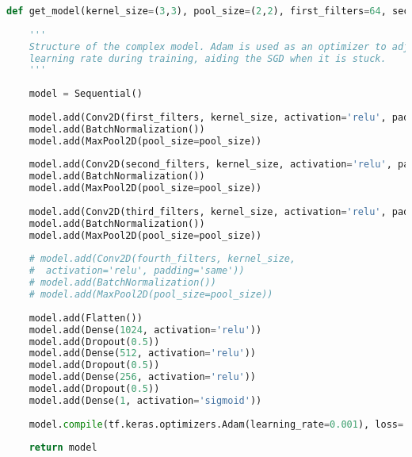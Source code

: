\begin{lstlisting}[language=Python, caption=Model 4]
def get_model(kernel_size=(3,3), pool_size=(2,2), first_filters=64, second_filters=128, third_filters=256, fourth_filters=1024):
    
    '''
    Structure of the complex model. Adam is used as an optimizer to adjust the 
    learning rate during training, aiding the SGD when it is stuck.
    ''' 
    
    model = Sequential()    
    
    model.add(Conv2D(first_filters, kernel_size, activation='relu', padding='same', input_shape=(IMAGE_SIZE, IMAGE_SIZE, 3)))
    model.add(BatchNormalization())
    model.add(MaxPool2D(pool_size=pool_size))
    
    model.add(Conv2D(second_filters, kernel_size, activation='relu', padding='same'))
    model.add(BatchNormalization())
    model.add(MaxPool2D(pool_size=pool_size))
    
    model.add(Conv2D(third_filters, kernel_size, activation='relu', padding='same'))
    model.add(BatchNormalization())
    model.add(MaxPool2D(pool_size=pool_size))
    
    # model.add(Conv2D(fourth_filters, kernel_size, 
    #  activation='relu', padding='same'))
    # model.add(BatchNormalization())
    # model.add(MaxPool2D(pool_size=pool_size))
    
    model.add(Flatten())
    model.add(Dense(1024, activation='relu'))
    model.add(Dropout(0.5))
    model.add(Dense(512, activation='relu'))
    model.add(Dropout(0.5))
    model.add(Dense(256, activation='relu'))
    model.add(Dropout(0.5))
    model.add(Dense(1, activation='sigmoid'))
    
    model.compile(tf.keras.optimizers.Adam(learning_rate=0.001), loss='binary_crossentropy', metrics=['accuracy'])
    
    return model
\end{lstlisting}